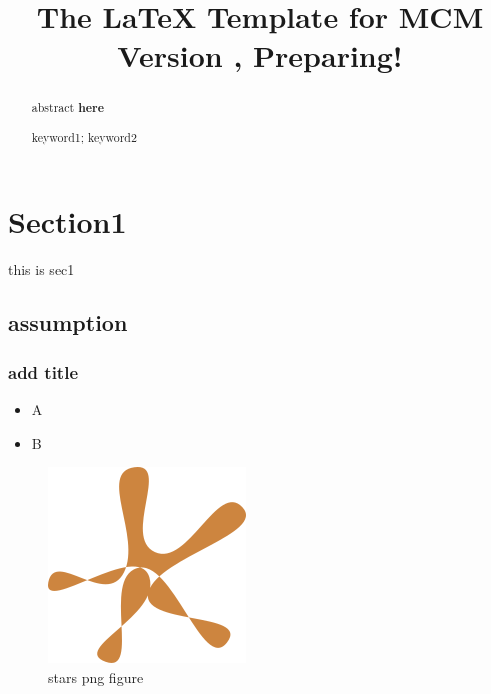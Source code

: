\documentclass{mcmthesis} %
\title{The \LaTeX{} Template for MCM Version \MCMversion, Preparing!} %
\begin{document}

\begin{abstract} %
    abstract\textbf{ here}  %
     
\begin{keywords} %
    keyword1; keyword2
\end{keywords}

\end{abstract}
\maketitle %

\tableofcontents

\newpage %


\section{Section1}

this is sec1


\subsection{assumption}
\subsubsection{add title}

\begin{itemize}
	\item A
	\item B
\end{itemize}

\begin{figure}[ht]
	\centering
	\includegraphics[scale = .35]{images/try-png.png}
	\caption{stars png figure}
	\label{fig:fig0} %
\end{figure}
\end{document}
